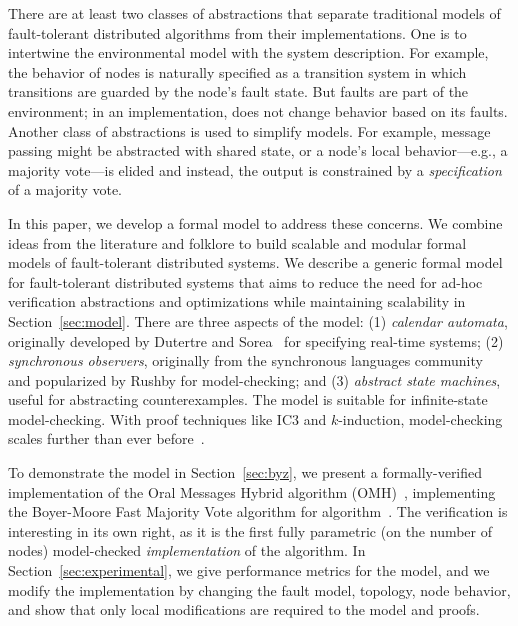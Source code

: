 \documentclass{llncs/llncs}
\begin{document}
There are at least two classes of abstractions that separate traditional models of fault-tolerant distributed algorithms from their implementations. One is to intertwine the environmental model with the system description. For example, the behavior of nodes is naturally specified as a transition system in which transitions are guarded by the node's fault state. But faults are part of the environment; in an implementation, does not change behavior based on its faults. Another class of abstractions is used to simplify models. For example, message passing might be abstracted with shared state, or a node's local behavior---e.g., a majority vote---is elided and instead, the output is constrained by a \emph{specification} of a majority vote.

In this paper, we develop a formal model to address these concerns. We combine ideas from the literature and folklore to build scalable and modular formal models of fault-tolerant distributed systems. We describe a generic formal model for fault-tolerant distributed systems that aims to reduce the need for ad-hoc verification abstractions and optimizations while maintaining scalability in Section~\ref{sec:model}. There are three aspects of the model: (1) \emph{calendar automata}, originally developed by Dutertre and Sorea~\cite{cal} for specifying real-time systems; (2) \emph{synchronous observers}, originally from the synchronous languages community~\cite{} and popularized by Rushby for model-checking; and (3) \emph{abstract state machines}, useful for abstracting counterexamples. The model is suitable for infinite-state model-checking. With proof techniques like IC3 and $k$-induction, model-checking scales further than ever before~\cite{pdr-kind}.

To demonstrate the model in Section~\ref{sec:byz}, we present a formally-verified implementation of the Oral Messages Hybrid algorithm (OMH)~\cite{}, implementing the Boyer-Moore Fast Majority Vote algorithm for algorithm~\cite{}. The verification is interesting in its own right, as it is the first fully parametric (on the number of nodes) model-checked \emph{implementation} of the algorithm. In Section~\ref{sec:experimental}, we give performance metrics for the model, and we modify the implementation by changing the fault model, topology, node behavior, and show that only local modifications are required to the model and proofs.


\end{document}
